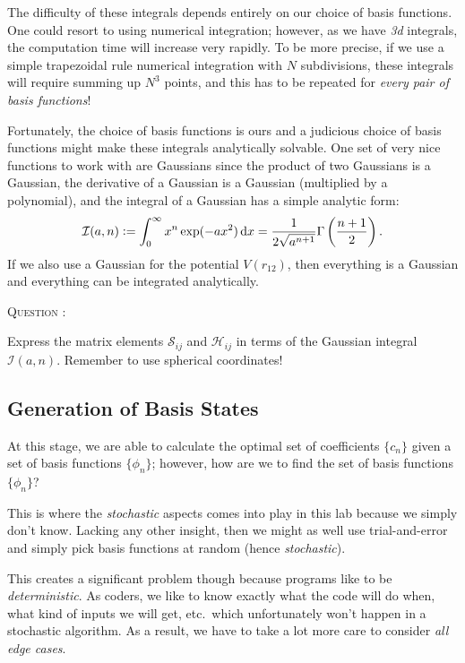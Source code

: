 \documentclass[
  a4paper,             %
  11pt,                %
  oneside,             %
  onecolumn,           %
  bibliography=totoc,  %
  final,               %
]{scrartcl}
\newcounter{question}
\newenvironment{question}{%
  \stepcounter{question}%
  \begin{tcolorbox}[
      colframe=black,
      sharp corners=all,
      boxsep=0.5ex,
    ]
    \noindent\textsc{\large Question \arabic{question}:} %
}{%
  \end{tcolorbox}%
}
\begin{document}
The difficulty of these integrals depends entirely on our choice of basis
functions.  One could resort to using numerical integration; however, as we have
\emph{3d} integrals, the computation time will increase very rapidly.  To be
more precise, if we use a simple trapezoidal rule numerical integration with
\(N\) subdivisions, these integrals will require summing up \(N^{3}\) points,
and this has to be repeated for \emph{every pair of basis functions}!

Fortunately, the choice of basis functions is ours and a judicious choice of
basis functions might make these integrals analytically solvable.  One set of
very nice functions to work with are Gaussians since the product of two
Gaussians is a Gaussian, the derivative of a Gaussian is a Gaussian (multiplied
by a polynomial), and the integral of a Gaussian has a simple analytic form:
\begin{equation}
  \mathcal{I}(a, n) \vcentcolon= \int_{0}^{\infty} x^{n} \exp(-a x^{2}) \mathop{}\!\mathrm{d} x = \frac{1}{2 \sqrt{a^{n+1}}} \Gamma\left( \frac{n+1}{2} \right).
\end{equation}
If we also use a Gaussian for the potential \(V(r_{12})\), then everything is a
Gaussian and everything can be integrated analytically.

\begin{question}
  Express the matrix elements \(\mathcal{S}_{ij}\) and \(\mathcal{H}_{ij}\) in
  terms of the Gaussian integral \(\mathcal{I}(a, n)\).  Remember to use
  spherical coordinates!
\end{question}

\subsection{Generation of Basis States}
\label{subsec:generation_of_basis_states}

At this stage, we are able to calculate the optimal set of coefficients
\(\{c_{n}\}\) given a set of basis functions \(\{\phi_{n}\}\); however, how are
we to find the set of basis functions \(\{\phi_{n}\}\)?

This is where the \emph{stochastic} aspects comes into play in this lab because
we simply don't know.  Lacking any other insight, then we might as well use
trial-and-error and simply pick basis functions at random (hence
\emph{stochastic}).

This creates a significant problem though because programs like to be
\emph{deterministic}.  As coders, we like to know exactly what the code will do
when, what kind of inputs we will get, etc.~which unfortunately won't happen in
a stochastic algorithm.  As a result, we have to take a lot more care to
consider \emph{all edge cases}.
\end{document}
